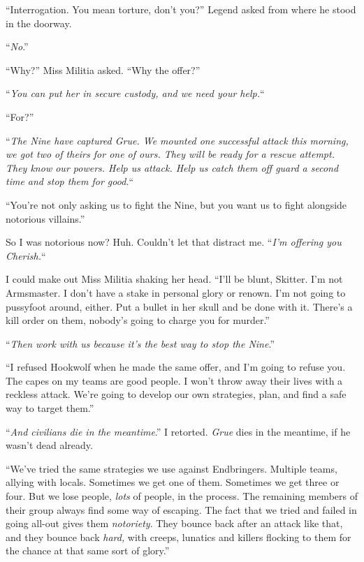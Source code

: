 ``Interrogation.  You mean torture, don't you?'' Legend asked from where he stood in the doorway.



``\emph{No}.''



``Why?''  Miss Militia asked.  ``Why the offer?''



``\emph{You can put her in secure custody, and we need your help.}``



``For?''



``\emph{The Nine have captured Grue.  We mounted one successful attack this morning, we got two of theirs for one of ours.  They will be ready for a rescue attempt.  They know our powers.  Help us attack.  Help us catch them off guard a second time and stop them for good.}``



``You're not only asking us to fight the Nine, but you want us to fight alongside notorious villains.''



So I was notorious now?  Huh.  Couldn't let that distract me.  ``\emph{I'm offering you Cherish.}``



I could make out Miss Militia shaking her head.  ``I'll be blunt, Skitter.  I'm not Armsmaster.  I don't have a stake in personal glory or renown.  I'm not going to pussyfoot around, either.  Put a bullet in her skull and be done with it.  There's a kill order on them, nobody's going to charge you for murder.''



``\emph{Then work with us because it's the best way to stop the Nine}.''



``I refused Hookwolf when he made the same offer, and I'm going to refuse you.  The capes on my teams are good people.  I won't throw away their lives with a reckless attack.  We're going to develop our own strategies, plan, and find a safe way to target them.''



``\emph{And civilians die in the meantime}.''  I retorted.  \emph{Grue} dies in the meantime, if he wasn't dead already.



``We've tried the same strategies we use against Endbringers.  Multiple teams, allying with locals.  Sometimes we get one of them.  Sometimes we get three or four.  But we lose people, \emph{lots} of people, in the process.  The remaining members of their group always find some way of escaping. The fact that we tried and failed in going all-out gives them \emph{notoriety}.  They bounce back after an attack like that, and they bounce back \emph{hard, }with creeps, lunatics and killers flocking to them for the chance at that same sort of glory.''



